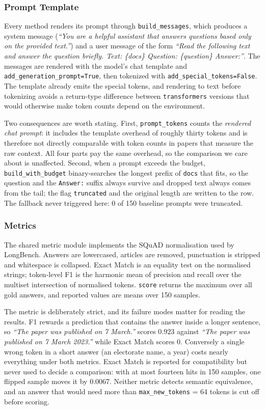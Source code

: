 ﻿\documentclass[10pt,a4paper,twocolumn]{article}
\begin{document}
\subsubsection{Prompt Template}

Every method renders its prompt through \texttt{build\_messages}, which produces
a system message (\emph{``You are a helpful assistant that answers questions
based only on the provided text.''}) and a user message of the form \emph{``Read
the following text and answer the question briefly. Text: \{docs\} Question:
\{question\} Answer:''}. The messages are rendered with the model's chat template
and \texttt{add\_generation\_prompt=True}, then tokenized with
\texttt{add\_special\_tokens=False}. The template already emits the special
tokens, and rendering to text before tokenizing avoids a return-type difference
between \texttt{transformers} versions that would otherwise make token counts
depend on the environment.

Two consequences are worth stating. First, \texttt{prompt\_tokens} counts the
\emph{rendered chat prompt}: it includes the template overhead of roughly thirty
tokens and is therefore not directly comparable with token counts in papers that
measure the raw context. All four parts pay the same overhead, so the comparison
we care about is unaffected. Second, when a prompt exceeds the budget,
\texttt{build\_with\_budget} binary-searches the longest prefix of \texttt{docs}
that fits, so the question and the \texttt{Answer:} suffix always survive and
dropped text always comes from the tail; the flag \texttt{truncated} and the
original length are written to the row. The fallback never triggered here: 0 of
150 baseline prompts were truncated.

\subsubsection{Metrics}

The shared metric module implements the SQuAD normalisation used by LongBench.
Answers are lowercased, articles are removed, punctuation is stripped and
whitespace is collapsed. Exact Match is an equality test on the normalised
strings; token-level F1 is the harmonic mean of precision and recall over the
multiset intersection of normalised tokens. \texttt{score} returns the maximum
over all gold answers, and reported values are means over 150 samples.

The metric is deliberately strict, and its failure modes matter for reading the
results. F1 rewards a prediction that contains the answer inside a longer
sentence, so \emph{``The paper was published on 7 March.''} scores 0.923 against
\emph{``The paper was published on 7 March 2023.''} while Exact Match scores 0.
Conversely a single wrong token in a short answer (an electorate name, a year)
costs nearly everything under both metrics. Exact Match is reported for
compatibility but never used to decide a comparison: with at most fourteen hits in
150 samples, one flipped sample moves it by 0.0067. Neither metric detects
semantic equivalence, and an answer that would need more than
\texttt{max\_new\_tokens} = 64 tokens is cut off before scoring.
\end{document}
